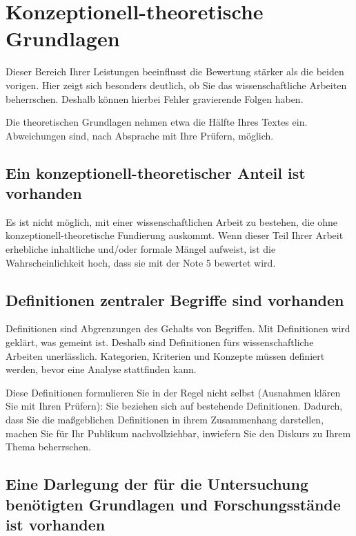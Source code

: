 \chapter{Konzeptionell-theoretische Grundlagen}
\label{chap:konzeptionell-theoretische-grundlagen}

Dieser Bereich Ihrer Leistungen beeinflusst die Bewertung stärker als die beiden vorigen. Hier zeigt sich besonders deutlich, ob Sie das wissenschaftliche Arbeiten beherrschen. Deshalb können hierbei Fehler gravierende Folgen haben.

Die theoretischen Grundlagen nehmen etwa die Hälfte Ihres Textes ein. Abweichungen sind, nach Absprache mit Ihre Prüfern, möglich.

\section{Ein konzeptionell-theoretischer Anteil ist vorhanden}
\label{sec:konzeptionell-theoretischer-anteil}

Es ist nicht möglich, mit einer wissenschaftlichen Arbeit zu bestehen, die ohne konzeptionell-theoretische Fundierung auskommt. Wenn dieser Teil Ihrer Arbeit erhebliche inhaltliche und/oder formale Mängel aufweist, ist die Wahrscheinlichkeit hoch, dass sie mit der Note 5 bewertet wird.

\section{Definitionen zentraler Begriffe sind vorhanden}
\label{sec:definitionen-begriffe}

Definitionen sind Abgrenzungen des Gehalts von Begriffen. Mit Definitionen wird geklärt, was gemeint ist. Deshalb sind Definitionen fürs wissenschaftliche Arbeiten unerlässlich. Kategorien, Kriterien und Konzepte müssen definiert werden, bevor eine Analyse stattfinden kann.

Diese Definitionen formulieren Sie in der Regel nicht selbst (Ausnahmen klären Sie mit Ihren Prüfern): Sie beziehen sich auf bestehende Definitionen. Dadurch, dass Sie die maßgeblichen Definitionen in ihrem Zusammenhang darstellen, machen Sie für Ihr Publikum nachvollziehbar, inwiefern Sie den Diskurs zu Ihrem Thema beherrschen.

\section{Eine Darlegung der für die Untersuchung benötigten Grundlagen und Forschungsstände ist vorhanden}
\label{sec:darlegung-grundlagen}


